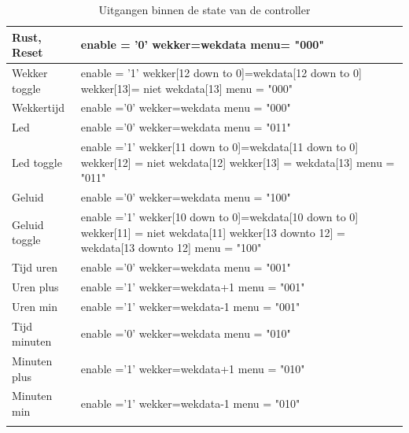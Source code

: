 \begin{longtable}{|l| p{10cm} |}
\hline
Rust, Reset &
enable = '0' \newline
wekker=wekdata \newline
menu= "000" \\ \hline
Wekker toggle &
enable = '1' \newline
wekker[12 down to 0]=wekdata[12 down to 0] \newline
wekker[13]= niet wekdata[13] \newline
menu = "000" \\ \hline
Wekkertijd &
enable ='0' \newline
wekker=wekdata \newline
menu = "000" \\ \hline
Led &
enable ='0' \newline
wekker=wekdata \newline
menu = "011" \\ \hline
Led toggle &
enable ='1' \newline
wekker[11 down to 0]=wekdata[11 down to 0]\newline
wekker[12] = niet wekdata[12] \newline
wekker[13] = wekdata[13] \newline
menu = "011" \\ \hline
Geluid & 
enable ='0' \newline
wekker=wekdata \newline
menu = "100" \\ \hline
Geluid toggle &
enable ='1' \newline
wekker[10 down to 0]=wekdata[10 down to 0] \newline
wekker[11] = niet wekdata[11] \newline
wekker[13 downto 12] = wekdata[13 downto 12] \newline
menu = "100" \\ \hline
Tijd uren &
enable ='0' \newline
wekker=wekdata \newline
menu = "001" \\ \hline
Uren plus &
enable ='1' \newline
wekker=wekdata+1 \newline
menu = "001" \\ \hline
Uren min &
enable ='1' \newline
wekker=wekdata-1 \newline
menu = "001" \\ \hline
Tijd minuten &
enable ='0' \newline
wekker=wekdata \newline
menu = "010" \\ \hline
Minuten plus &
enable ='1' \newline
wekker=wekdata+1 \newline
menu = "010" \\ \hline
Minuten min &
enable ='1' \newline
wekker=wekdata-1 \newline
menu = "010" \\ \hline
\caption{Uitgangen binnen de state van de controller} 
\label{tab:states_controller}
\end{longtable}

